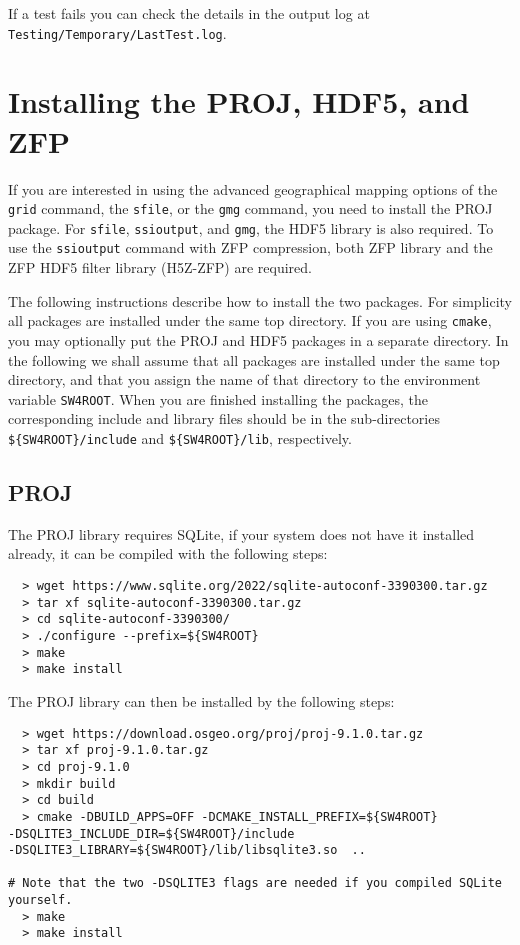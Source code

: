 \documentclass[11pt]{article}
\begin{document}
If a test fails you can check the details in the output log at
\texttt{Testing/Temporary/LastTest.log}.

\section{Installing the PROJ, HDF5, and ZFP}\label{sec:proj}
 

If you are interested in using the advanced geographical mapping options of the {\tt grid} command, the {\tt sfile}, or the {\tt gmg} command, you need to install the PROJ package. For {\tt sfile}, {\tt ssioutput},  and {\tt gmg}, the HDF5 library is also required. To use the {\tt ssioutput} command with ZFP compression, both ZFP library and the ZFP HDF5 filter library (H5Z-ZFP) are required.  

The following instructions describe how to install the two packages. For simplicity all packages
are installed under the same top directory. If you are using {\tt cmake}, you may optionally put the
PROJ and HDF5 packages in a separate directory. In the following we shall assume that all packages are
installed under the same top directory, and that you assign the name of that directory to the
environment variable \verb+SW4ROOT+. When you are finished installing the packages, the
corresponding include and library files should be in the sub-directories \verb+${SW4ROOT}/include+
and \verb+${SW4ROOT}/lib+, respectively.

\subsection{PROJ}
The PROJ library requires SQLite, if your system does not have it installed already, it can be compiled with the following steps:
\begin{verbatim}
  > wget https://www.sqlite.org/2022/sqlite-autoconf-3390300.tar.gz
  > tar xf sqlite-autoconf-3390300.tar.gz
  > cd sqlite-autoconf-3390300/
  > ./configure --prefix=${SW4ROOT}
  > make
  > make install
\end{verbatim}

The PROJ library can then be installed by the following steps:

\begin{verbatim}
  > wget https://download.osgeo.org/proj/proj-9.1.0.tar.gz
  > tar xf proj-9.1.0.tar.gz
  > cd proj-9.1.0
  > mkdir build
  > cd build
  > cmake -DBUILD_APPS=OFF -DCMAKE_INSTALL_PREFIX=${SW4ROOT}
-DSQLITE3_INCLUDE_DIR=${SW4ROOT}/include
-DSQLITE3_LIBRARY=${SW4ROOT}/lib/libsqlite3.so  ..

# Note that the two -DSQLITE3 flags are needed if you compiled SQLite yourself.
  > make
  > make install
\end{verbatim}
\end{document}
